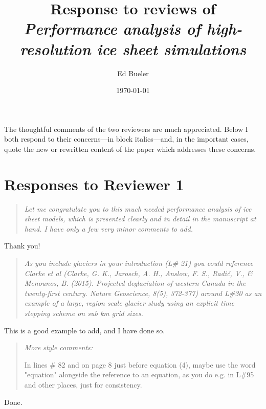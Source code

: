 \documentclass[letterpaper,final,12pt,reqno]{amsart}
\newenvironment{review}%
{\bigskip \par \begin{quote} \selectfont \sl}%
{\end{quote}}
\begin{document}
\title{Response to reviews of \emph{Performance analysis of high-resolution ice sheet simulations}}

\author{Ed Bueler}

\date{\today}

\maketitle


\thispagestyle{empty}

The thoughtful comments of the two reviewers are much appreciated.  Below I both respond to their concerns---in block italics---and, in the important cases, quote the new or rewritten content of the paper which addresses these concerns.

\section{Responses to Reviewer 1}

\begin{review}
Let me congratulate you to this much needed performance analysis of ice sheet models, which is presented clearly and in detail in the manuscript at hand. I have only a few very minor comments to add.
\end{review}

\noindent Thank you!

\begin{review}
As you include glaciers in your introduction (L\# 21) you could reference Clarke et al (Clarke, G. K., Jarosch, A. H., Anslow, F. S., Radić, V., \& Menounos, B. (2015). Projected deglaciation of western Canada in the twenty-first century. Nature Geoscience, 8(5), 372-377) around L\#30 as an example of a large, region scale glacier study using an explicit time stepping scheme on sub km grid sizes.
\end{review}

\noindent This is a good example to add, and I have done so.

\begin{review}
More style comments:

In lines \# 82 and on page 8 just before equation (4), maybe use the word "equation" alongside the reference to an equation, as you do e.g. in L\#95 and other places, just for consistency.
\end{review}

\noindent Done.
\end{document}
